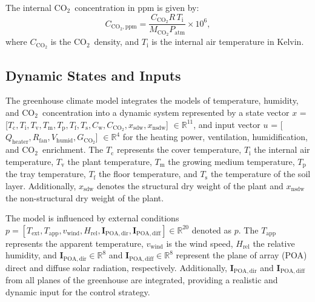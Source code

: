 \documentclass[conference]{IEEEtran}
\newcommand{\ui}[2]{#1_{\mathrm{#2}}}
\newcommand{\coo}{\ensuremath{\mathrm{CO_2}}}
\begin{document}
The internal \coo\ concentration in ppm is given by:
\begin{equation}
    \ui{C}{\coo, ppm} = \frac{C_{\coo}  R\, \ui{T}{i}}{M_{\coo}  \ui{P}{atm}} \times 10^6,
\end{equation}
where \(C_{\coo}\) is the \coo\ density, and \(\ui{T}{i}\) is the internal air temperature in Kelvin.


\subsection{Dynamic States and Inputs}
The greenhouse climate model integrates the models of temperature, humidity, and \coo\ concentration into a dynamic system represented by a state vector \linebreak \(x\) = [\(\ui{T}{c}, \ui{T}{i}, \ui{T}{v}, \ui{T}{m}, \ui{T}{p}, \ui{T}{f}, \ui{T}{s}, \ui{C}{w}, \ui{C}{\coo}, \ui{x}{sdw}, \ui{x}{nsdw}\)] \( \in\mathbb R^{11} \), and input vector \(u\) = [\(\ui{Q}{heater}, \ui{R}{fan}, \ui{V}{humid}, \ui{G}{\coo} \)] \( \in\mathbb R^{4} \) for the heating power, ventilation, humidification, and \coo\ enrichment. The \(\ui{T}{c}\) represents the cover temperature, \(\ui{T}{i}\) the internal air temperature, \(\ui{T}{v}\) the plant temperature, \(\ui{T}{m}\) the growing medium temperature, \(\ui{T}{p}\) the tray temperature, \(\ui{T}{f}\) the floor temperature, and \(\ui{T}{s}\) the temperature of the soil layer. Additionally, \(\ui{x}{sdw}\) denotes the structural dry weight of the plant and \(\ui{x}{nsdw}\) the non-structural dry weight of the plant.

The model is influenced by external conditions \linebreak \( p = \left[
    \ui{T}{ext}, \ui{T}{app}, \ui{v}{wind}, \ui{H}{rel}, \ui{\mathbf{I}}{POA,dir}, \ui{\mathbf{I}}{POA,diff} \right] \in \mathbb{R}^{20} \) denoted as \(p\). The \(\ui{T}{app}\) represents the apparent temperature, \(\ui{v}{wind}\) is the wind speed, \(\ui{H}{rel}\) the relative humidity, and \(\ui{\mathbf{I}}{POA,dir}\in \mathbb{R}^{8}\) and \(\ui{\mathbf{I}}{POA,diff}\in \mathbb{R}^{8}\) represent the plane of array (POA) direct and diffuse solar radiation, respectively. Additionally, \(\ui{\mathbf{I}}{POA,dir}\) and \(\ui{\mathbf{I}}{POA,diff}\) from all planes of the greenhouse are integrated, providing a realistic and dynamic input for the control strategy.
\end{document}
